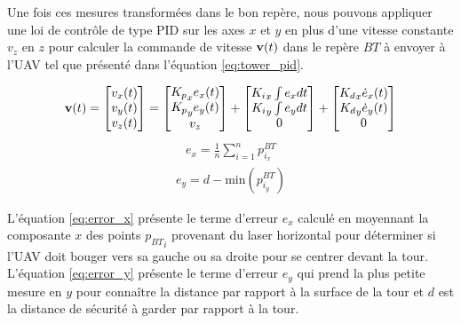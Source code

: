 Une fois ces mesures transformées dans le bon repère, nous pouvons appliquer une loi de contrôle de type PID sur les axes $x$ et $y$ en plus d'une vitesse constante $v_z$ en $z$ pour calculer la commande de vitesse $\mathbf{v}(t)$ dans le repère ${BT}$ à envoyer à l'UAV tel que présenté dans l'équation \ref{eq:tower_pid}.

\begin{align}
  \mathbf{v}(t) = \begin{bmatrix}v_x(t)\\ v_y(t)\\ v_z(t)\end{bmatrix} =
  \begin{bmatrix}{K_p}_x e_x(t)\\ {K_p}_y e_y(t)\\ v_z\end{bmatrix} +
  \begin{bmatrix}{K_i}_x \int e_x dt\\ {K_i}_y \int e_y dt\\ 0\end{bmatrix} +
  \begin{bmatrix}{K_d}_x \dot{e}_x(t)\\ {K_d}_y \dot{e}_y(t)\\ 0\end{bmatrix}
  \label{eq:tower_pid}
\end{align}
\begin{align}
  e_x = \frac{1}{n} \sum_{i = 1}^n p^{BT}_{i_x}
  \label{eq:error_x}
\end{align}
\begin{align}
  e_y = d - {\text{min}}({p^{BT}_{i_y}})
  \label{eq:error_y}
\end{align}

L'équation \ref{eq:error_x} présente le terme d'erreur $e_x$ calculé en moyennant la composante $x$ des points ${p_{BT}}_i$ provenant du laser horizontal pour déterminer si l'UAV doit bouger vers sa gauche ou sa droite pour se centrer devant la tour. L'équation \ref{eq:error_y} présente le terme d'erreur $e_y$ qui prend la plus petite mesure en $y$ pour connaître la distance par rapport à la surface de la tour et $d$ est la distance de sécurité à garder par rapport à la tour.

